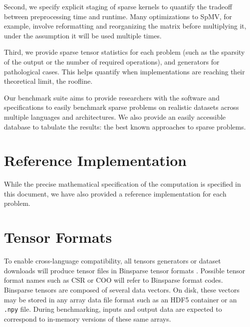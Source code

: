 \documentclass{article}
\begin{document}
Second, we specify explicit staging of sparse kernels to quantify the tradeoff between preprocessing time and runtime. Many optimizations to SpMV, for example, involve reformatting and reorganizing the matrix before multiplying it, under the assumption it will be used multiple times.

Third, we provide sparse tensor statistics for each problem (such as the sparsity of the output or the number of required operations), and generators for pathological cases. This helps quantify when implementations are reaching their theoretical limit, the roofline.

Our benchmark suite aims to provide researchers with the software and specifications to easily benchmark sparse problems on realistic datasets across multiple languages and architectures. We also provide an easily accessible database to tabulate the results: the best known approaches to sparse problems.


\section{Reference Implementation}

While the precise mathematical specification of the computation is specified in this document, we have also provided a reference implementation for each problem.

\section{Tensor Formats} \label{sec:formats}

To enable cross-language compatibility, all tensors generators or dataset downloads will produce tensor files in Binsparse tensor formats \cite{noauthor_graphblasbinsparse-specification_nodate}. Possible tensor format names such as CSR or COO will refer to Binsparse format codes. Binsparse tensors are composed of several data vectors. On disk, these vectors may be stored in any array data file format such as an HDF5 container or an \texttt{.npy} file. During benchmarking, inputs and output data are expected to correspond to in-memory versions of these same arrays.
\end{document}
